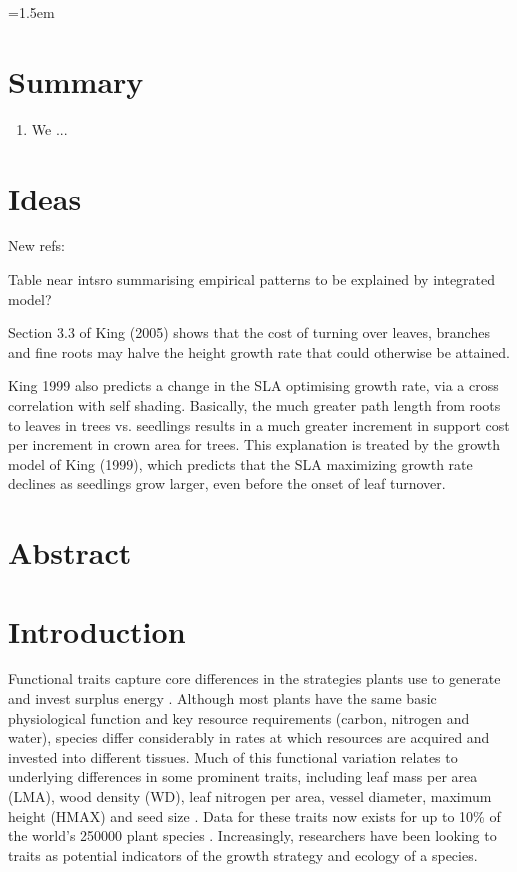 \documentclass[a4paper,11pt]{article}
\date{}
\begin{document}
\mstitlepage
\noindent
\parindent=1.5em
\addtolength{\parskip}{.3em}
\doublespacing
\linenumbers
\section{Summary}\label{abstract}
\begin{enumerate}
\def\labelenumi{\arabic{enumi}.}
\item We ...
\end{enumerate}

\section{Ideas}\label{abstract}

New refs: \citep{Ishihara-2016, Duursma-2016, Gibert-2016, Falster-2016, Kunstler-2015,Falster-2015b, Falster-2015a,Wenk-2015,Li-2014}

Table near intsro summarising empirical patterns to be explained by integrated model?

Section 3.3 of King (2005) shows that the cost of turning over leaves, branches and fine roots may halve the height growth rate that could otherwise be attained.

King 1999 also predicts a change in the SLA optimising growth rate, via a cross correlation with self shading. Basically, the much greater path length from roots to leaves in trees vs. seedlings results in a much greater increment in support cost per increment in crown area for trees. This explanation is treated by the growth model of King (1999), which predicts that the SLA maximizing growth rate declines as seedlings grow larger, even before the onset of leaf turnover.

\section{Abstract}\label{abstract}

\section{Introduction}\label{introduction}

Functional traits capture core differences in the strategies
plants use to generate and invest surplus energy
 \citep{Wright-2004, Chave-2009, Westoby-2002}.
Although most plants have the same basic physiological function
and key resource requirements (carbon, nitrogen and water), species differ considerably in
rates at which resources are acquired and invested into different tissues.
Much of this functional variation relates to underlying
differences in some prominent traits, including leaf
mass per area (LMA), wood density (WD), leaf nitrogen per area, vessel
diameter,  maximum  height (HMAX) and seed size  \citep{Wright-2004, Chave-2009}.
Data for these traits now exists for up to 10\% of the world's 250000 plant species
\citep{Cornwell-2014}. Increasingly, researchers have been looking to traits
as potential indicators of the growth strategy and ecology of a species.
\end{document}
